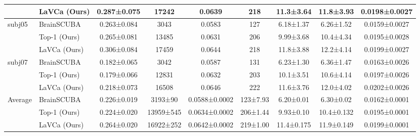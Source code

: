 \begin{table*}[t]
\begin{tabular}{@{}llccccccc@{}}
 & LaVCa (Ours)        &  0.287±0.075 & 17242 & 0.0639 & 218 & 11.3±3.64 & 11.8±3.93 & 0.0198±0.0027 \\ 
\midrule
\multirow{3}{*}{subj05} 
 & BrainSCUBA          &  0.263±0.084 & 3043 & 0.0583 & 127 &  6.18±1.37 &  6.26±1.52 & 0.0159±0.0027 \\
 & Top-1 (Ours)     &  0.265±0.081 & 13485 & 0.0631 & 206 &  9.99±3.68 & 10.4±4.34 & 0.0195±0.0028 \\
 & LaVCa (Ours)        &  0.306±0.084 & 17459 & 0.0644 & 218 & 11.8±3.88 & 12.2±4.14 & 0.0199±0.0027 \\ 
\midrule
\multirow{3}{*}{subj07} 
 & BrainSCUBA          &  0.182±0.065 & 3042 & 0.0587 & 131 &  6.23±1.30 &  6.36±1.47 & 0.0163±0.0026 \\
 & Top-1 (Ours)     &  0.179±0.066 & 12831 & 0.0632 & 203 & 10.1±3.51 & 10.6±4.14 & 0.0197±0.0026 \\
 & LaVCa (Ours)        &  0.218±0.073 & 16508 & 0.0646 & 222 & 11.6±3.76 & 12.0±4.02 & 0.0202±0.0026 \\
\midrule
\multirow{3}{*}{Average} 
 & BrainSCUBA          
   & 0.226±0.019 & 3193±90 & 0.0588±0.0002 & 123±7.93 
   & 6.20±0.01 & 6.30±0.02 & 0.0162±0.0001 \\
 & Top-1 (Ours) 
   & 0.224±0.020 & 13959±545 & 0.0634±0.0002 & 206±1.44 
   & 9.93±0.10 & 10.4±0.132 & 0.0195±0.0001 \\
 & LaVCa (Ours) 
   & 0.264±0.020 & 16922±252 & 0.0642±0.0002 & 219±1.00 
   & 11.4±0.175 & 11.9±0.149 & 0.0199±0.0001 \\
\bottomrule
\end{tabular}
\label{table:diversity_analysis}
\end{table*}




\clearpage

